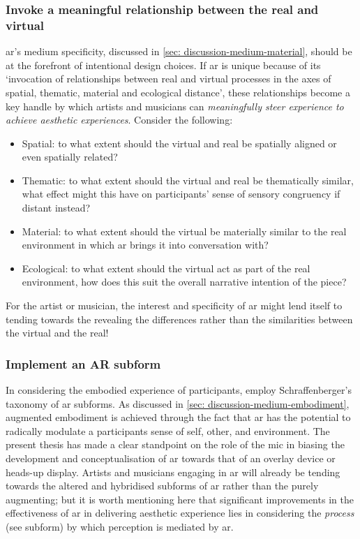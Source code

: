 \subsubsection{Invoke a meaningful relationship between the real and virtual}
\gls{ar}'s medium specificity, discussed in \autoref{sec: discussion-medium-material}, should be at the forefront of intentional design choices. If \gls{ar} is unique because of its `invocation of relationships between real and virtual processes in the axes of spatial, thematic, material and ecological distance', these relationships become a key handle by which artists and musicians can \textit{meaningfully steer experience to achieve aesthetic experiences}. Consider the following:
\begin{itemize}
    \item Spatial: to what extent should the virtual and real be spatially aligned or even spatially related?
    \item Thematic: to what extent should the virtual and real be thematically similar, what effect might this have on participants' sense of sensory congruency if distant instead?
    \item Material: to what extent should the virtual be materially similar to the real environment in which \gls{ar} brings it into conversation with? 
    \item Ecological: to what extent should the virtual act as part of the real environment, how does this suit the overall narrative intention of the piece?
\end{itemize}
For the artist or musician, the interest and specificity of \gls{ar} might lend itself to tending towards the revealing the differences rather than the similarities between the virtual and the real!

\subsubsection{Implement an AR subform}
In considering the embodied experience of participants, employ Schraffenberger's taxonomy of \gls{ar} subforms. As discussed in \autoref{sec: discussion-medium-embodiment}, augmented embodiment is achieved through the fact that \gls{ar} has the potential to radically modulate a participants sense of self, other, and environment. The present thesis has made a clear standpoint on the role of the \gls{mic} in biasing the development and conceptualisation of \gls{ar} towards that of an overlay device or heads-up display. Artists and musicians engaging in \gls{ar} will already be tending towards the altered and hybridised subforms of \gls{ar} rather than the purely augmenting; but it is worth mentioning here that significant improvements in the effectiveness of \gls{ar} in delivering aesthetic experience lies in considering the \textit{process} (see subform) by which perception is mediated by \gls{ar}.

